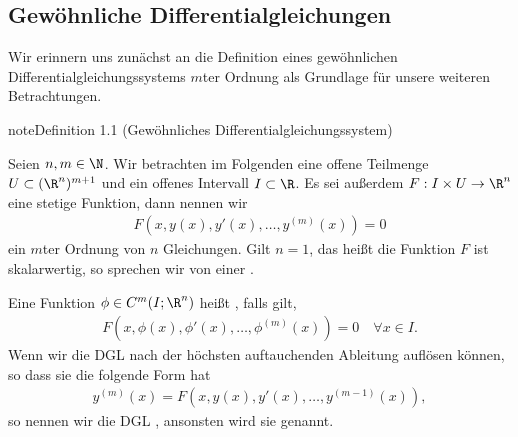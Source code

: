 \documentclass[letterpaper,10pt,english]{jupyterBook}
\begin{document}
\subsection{Gewöhnliche Differentialgleichungen}
\label{\detokenize{ode/repetition:gewohnliche-differentialgleichungen}}
\sphinxAtStartPar
Wir erinnern uns zunächst an die Definition eines gewöhnlichen Differentialgleichungssystems \(m\)\sphinxhyphen{}ter Ordnung als Grundlage für unsere weiteren Betrachtungen.
\label{ode/repetition:def:DGL}
\begin{sphinxadmonition}{note}{Definition 1.1 (Gewöhnliches Differentialgleichungssystem)}



\sphinxAtStartPar
Seien \(n,m \in \N\).
Wir betrachten im Folgenden eine offene Teilmenge \(U\subset (\R^n)^{m+1}\) und ein offenes Intervall \(I\subset\R\).
Es sei außerdem \(F:I\times U\rightarrow\R^n\) eine stetige Funktion, dann nennen wir
\begin{equation}\label{equation:ode/repetition:eq:DGL}
\begin{split}F(x,y(x),y'(x),\ldots,y^{(m)}(x)) = 0\end{split}
\end{equation}
\sphinxAtStartPar
ein  \(m\)\sphinxhyphen{}ter Ordnung von \(n\) Gleichungen.
Gilt \(n=1\), das heißt die Funktion \(F\) ist skalarwertig, so sprechen wir von einer .

\sphinxAtStartPar
Eine Funktion \(\phi\in C^m(I;\R^n)\) heißt , falls gilt,
\begin{equation*}
\begin{split}F(x, \phi(x), \phi'(x), \ldots, \phi^{(m)}(x)) = 0 \quad \forall x\in I.\end{split}
\end{equation*}
\sphinxAtStartPar
Wenn wir die DGL nach der höchsten auftauchenden Ableitung auflösen können, so dass sie die folgende Form hat
\begin{equation*}
\begin{split}y^{(m)}(x) = F(x,y(x),y'(x),\ldots,y^{(m-1)}(x)),\end{split}
\end{equation*}
\sphinxAtStartPar
so nennen wir die DGL , ansonsten wird sie  genannt.
\end{sphinxadmonition}
\end{document}
